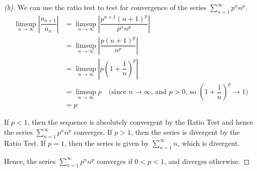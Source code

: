 \documentclass{article}
\begin{document}
\begin{proof}[(b)]
    We can use the ratio test to test for convergence of the series $\displaystyle\sum_{n=1}^{\infty} p^n n^p$.
    \begin{align*}
        \limsup\limits_{n \to \infty} \left| \dfrac{a_{n+1}}{a_n} \right| 
        &= \limsup\limits_{n \to \infty} \left| \dfrac{p^{n+1} (n+1)^p}{p^n n^p} \right| \\
        &= \limsup\limits_{n \to \infty} \left| \dfrac{p(n+1)^p}{n^p} \right| \\
        &= \limsup\limits_{n \to \infty} \left| p \left( 1 + \dfrac{1}{n} \right)^p \right| \\
        &= \limsup\limits_{n \to \infty} p \quad \text{(since $n \to \infty$, and $p > 0$, so $\left( 1 + \dfrac{1}{n} \right)^p \to 1$)} \\
        &= p
    \end{align*}

    If $p < 1$, then the sequence is absolutely convergent by the Ratio Test and hence the series $\displaystyle\sum_{n=1}^{\infty} p^n n^p$ converges. If $p > 1$, then the series is divergent by the Ratio Test. If $p = 1$, then the series is given by $\displaystyle\sum_{n=1}^{\infty} n$, which is divergent.

    Hence, the series $\displaystyle\sum_{n=1}^{\infty} p^n n^p$ converges if $0 < p < 1$, and diverges otherwise.

\end{proof}
\end{document}
